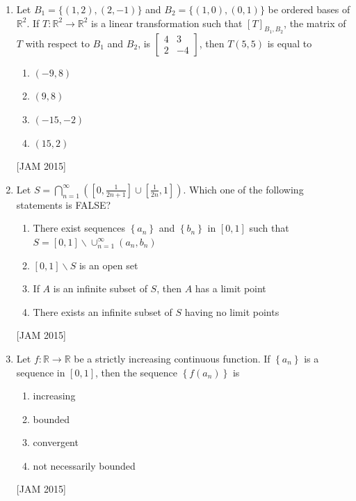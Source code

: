 \begin{enumerate}
\begin{enumerate}
\end{enumerate}
\hfill [JAM 2015]





\item Let $B_{1}=\{(1,2),(2,-1)\}$ and $B_{2}=\{(1,0),(0,1)\}$ be ordered bases of $\mathbb{R}^{2}$. If $T: \mathbb{R}^{2} \rightarrow \mathbb{R}^{2}$ is a linear transformation such that $[T]_{B_{1}, B_{2}}$, the matrix of $T$ with respect to $B_{1}$ and $B_{2}$, is $\left[\begin{array}{cc}4 & 3 \\ 2 & -4\end{array}\right]$, then $T(5,5)$ is equal to 

\begin{enumerate}
    
\item $(-9,8)$ 
\item $(9,8)$ 
\item $(-15,-2)$ 
\item $(15,2)$
\end{enumerate}
\hfill [JAM 2015]


\item 

Let $S=\bigcap_{n=1}^{\infty}\left(\left[0, \frac{1}{2 n+1}\right] \cup\left[\frac{1}{2 n}, 1\right]\right)$. Which one of the following statements is FALSE? 

\begin{enumerate}
    \item There exist sequences $\left\{a_{n}\right\}$ and $\left\{b_{n}\right\}$ in $[0,1]$ such that $S=[0,1] \backslash \cup_{n=1}^{\infty}\left(a_{n}, b_{n}\right)$ 
\item $[0,1] \backslash S$ is an open set 
\item If $A$ is an infinite subset of $S$, then $A$ has a limit point 
\item There exists an infinite subset of $S$ having no limit points

\end{enumerate}
\hfill [JAM 2015]




\item  Let $f: \mathbb{R} \rightarrow \mathbb{R}$ be a strictly increasing continuous function. If $\left\{a_{n}\right\}$ is a sequence in $[0,1]$, then the sequence $\left\{f\left(a_{n}\right)\right\}$ is 
\begin{enumerate}
    \item increasing 
\item bounded 
\item convergent 
\item not necessarily bounded
\end{enumerate}
\hfill [JAM 2015]






\end{enumerate}
